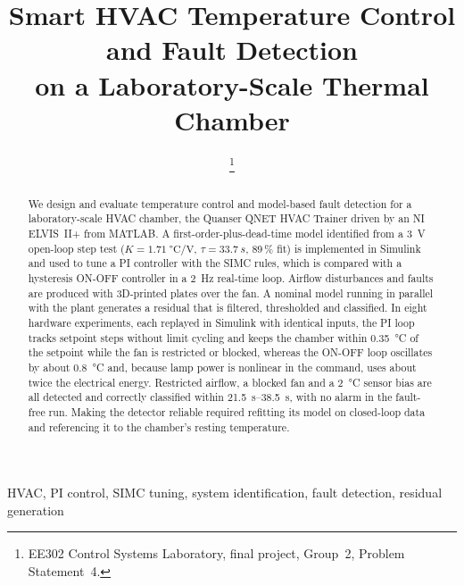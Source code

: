 \documentclass[conference,a4paper]{IEEEtran}
\begin{document}
\title{Smart HVAC Temperature Control and Fault Detection\\ on a Laboratory-Scale Thermal Chamber}

\author{
\and
{}
\and
{}
\thanks{EE302 Control Systems Laboratory, final project, Group~2, Problem Statement~4.}
}

\maketitle

\begin{abstract}
We design and evaluate temperature control and model-based fault detection for a laboratory-scale
HVAC chamber, the Quanser QNET HVAC Trainer driven by an NI ELVIS~II+ from MATLAB.
A first-order-plus-dead-time model identified from a \SI{3}{V} open-loop step test
($K=\SI{1.71}{\celsius\per\volt}$, $\tau=\SI{33.7}{s}$, 89\,\% fit) is implemented in Simulink and
used to tune a PI controller with the SIMC rules, which is compared with a hysteresis ON-OFF
controller in a \SI{2}{Hz} real-time loop. Airflow disturbances and faults are produced with
3D-printed plates over the fan. A nominal model running in parallel with the plant generates a
residual that is filtered, thresholded and classified. In eight hardware experiments, each replayed in
Simulink with identical inputs, the PI loop tracks setpoint steps without limit cycling and keeps the
chamber within \SI{0.35}{\celsius} of the setpoint while the fan is restricted or blocked, whereas
the ON-OFF loop oscillates by about \SI{0.8}{\celsius} and, because lamp power is nonlinear in the command, uses about twice the electrical energy. Restricted airflow, a blocked fan and a
\SI{2}{\celsius} sensor bias are all detected and correctly classified within
\SIrange{21.5}{38.5}{s}, with no alarm in the fault-free run. Making the detector reliable required
refitting its model on closed-loop data and referencing it to the chamber's resting temperature.
\end{abstract}

\begin{IEEEkeywords}
HVAC, PI control, SIMC tuning, system identification, fault detection, residual generation
\end{IEEEkeywords}

\end{document}
